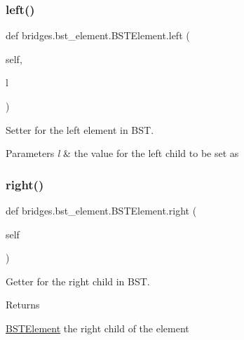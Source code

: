 \subsubsection{\texorpdfstring{left()}{left()}\hspace{0.1cm}{\footnotesize\ttfamily [2/2]}}
{\footnotesize\ttfamily def bridges.\+bst\+\_\+element.\+B\+S\+T\+Element.\+left (\begin{DoxyParamCaption}\item[{}]{self,  }\item[{}]{l }\end{DoxyParamCaption})}



Setter for the left element in B\+ST. 


\begin{DoxyParams}{Parameters}
{\em l} & the value for the left child to be set as \\
\hline
\end{DoxyParams}
\mbox{\label{classbridges_1_1bst__element_1_1_b_s_t_element_a3ec82fbc56a5e6309b69d2d963b483fd}} 
\subsubsection{\texorpdfstring{right()}{right()}\hspace{0.1cm}{\footnotesize\ttfamily [1/2]}}
{\footnotesize\ttfamily def bridges.\+bst\+\_\+element.\+B\+S\+T\+Element.\+right (\begin{DoxyParamCaption}\item[{}]{self }\end{DoxyParamCaption})}



Getter for the right child in B\+ST. 

\begin{DoxyReturn}{Returns}


\mbox{\hyperlink{classbridges_1_1bst__element_1_1_b_s_t_element}{B\+S\+T\+Element}} the right child of the element 
\end{DoxyReturn}
\mbox{\label{classbridges_1_1bst__element_1_1_b_s_t_element_a978ae0db366dee59703ed266eebca0e9}} 

